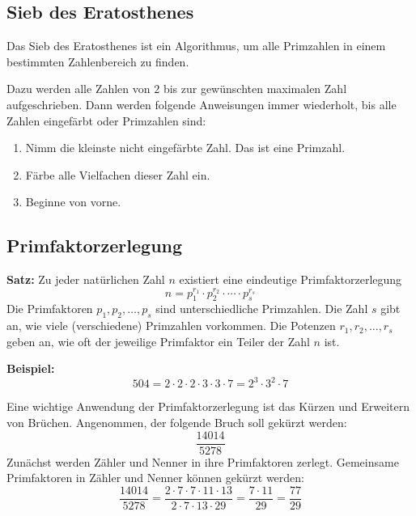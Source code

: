 \subsection{Sieb des Eratosthenes}

Das Sieb des Eratosthenes ist ein Algorithmus, um alle Primzahlen in einem bestimmten Zahlenbereich zu finden.

Dazu werden alle Zahlen von $2$ bis zur gewünschten maximalen Zahl aufgeschrieben. Dann werden folgende Anweisungen immer wiederholt, bis alle Zahlen eingefärbt oder Primzahlen sind:
\begin{enumerate}
  \item Nimm die kleinste nicht eingefärbte Zahl. Das ist eine Primzahl.
  \item Färbe alle Vielfachen dieser Zahl ein.
  \item Beginne von vorne.
\end{enumerate}

\newpage
\subsection{Primfaktorzerlegung}

\begin{theorem}
  \textbf{Satz:} Zu jeder natürlichen Zahl $n$ existiert eine eindeutige Primfaktorzerlegung
  \[
    n = p_{1}^{r_{1}} \cdot p_{2}^{r_{2}} \cdot \cdots \cdot p_{s}^{r_{s}}
  \]
  Die Primfaktoren $p_{1}, p_{2}, \ldots, p_{s}$ sind unterschiedliche Primzahlen. Die Zahl $s$ gibt an, wie viele (verschiedene) Primzahlen vorkommen. Die Potenzen $r_{1}, r_{2},\ldots, r_{s}$ geben an, wie oft der jeweilige Primfaktor ein Teiler der Zahl $n$ ist.
\end{theorem}
\begin{example}
  \textbf{Beispiel:}
  \[
    504 = 2\cdot 2\cdot 2\cdot 3\cdot 3\cdot 7 = 2^{3}\cdot 3^{2}\cdot 7
  \]
\end{example}
Eine wichtige Anwendung der Primfaktorzerlegung ist das Kürzen und Erweitern von Brüchen. Angenommen, der folgende Bruch soll gekürzt werden:
\[
  \frac{14014}{5278}
\]
Zunächst werden Zähler und Nenner in ihre Primfaktoren zerlegt. Gemeinsame Primfaktoren in Zähler und Nenner können gekürzt werden:
\[
  \frac{14014}{5278} = \frac{2\cdot 7\cdot 7\cdot 11\cdot 13}{2\cdot 7\cdot 13\cdot 29} = \frac{7\cdot 11}{29} = \frac{77}{29}
\]

